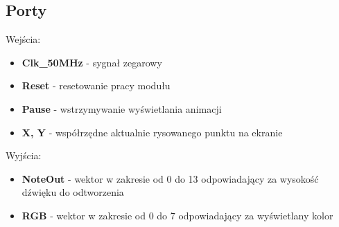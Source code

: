 \documentclass[a4paper]{report}
\begin{document}
		\subsection{Porty}
		{\Large Wejścia:}
			\begin{itemize}	 
				\item	\textbf{Clk\_50MHz} - sygnał zegarowy
				\item \textbf{Reset} - resetowanie pracy modułu
				\item 	\textbf{Pause} - wstrzymywanie wyświetlania animacji
				\item \textbf{X, Y} - współrzędne aktualnie rysowanego punktu na ekranie
			\end{itemize}
		{\Large Wyjścia:}
			\begin{itemize} 
				\item 	\textbf{NoteOut} - wektor w zakresie od 0 do 13 odpowiadający za wysokość dźwięku do odtworzenia
				\item 	\textbf{RGB} - wektor w zakresie od 0 do 7 odpowiadający za wyświetlany kolor
			\end{itemize}
\end{document}
